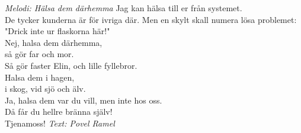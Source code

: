 {\footnotesize\textit{Melodi: Hälsa dem därhemma}}
\vspace{10pt}
Jag kan hälsa till er från systemet.\\
De tycker kunderna är för ivriga där.
Men en skylt skall numera lösa problemet:\\
"Drick inte ur flaskorna här!"\\
Nej, halsa dem därhemma,\\
så gör far och mor.\\
Så gör faster Elin, och lille fyllebror.\\
Halsa dem i hagen,\\
i skog, vid sjö och älv.\\
Ja, halsa dem var du vill, men inte hos oss.\\
Då får du hellre bränna själv!\\
Tjenamoss!
\vspace{10pt}
{\footnotesize\textit{Text: Povel Ramel}}
